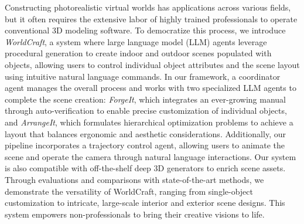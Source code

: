 Constructing photorealistic virtual worlds has applications across various fields, but it often requires the extensive labor of highly trained professionals to operate conventional 3D modeling software. 
%
To democratize this process, we introduce \emph{WorldCraft}, a system where large language model (LLM) agents leverage procedural generation to create indoor and outdoor scenes populated with objects, allowing users to control individual object attributes and the scene layout using intuitive natural language commands.
%
In our framework, a coordinator agent manages the overall process and works with two specialized LLM agents to complete the scene creation:  \emph{ForgeIt}, which integrates an ever-growing manual through auto-verification to enable precise customization of individual objects, and \emph{ArrangeIt}, which formulates hierarchical optimization problems to achieve a layout that balances ergonomic and aesthetic considerations.
%
Additionally, our pipeline incorporates a trajectory control agent, allowing users to animate the scene and operate the camera through natural language interactions. Our system is also compatible with off-the-shelf deep 3D generators to enrich scene assets.
%
Through evaluations and comparisons with state-of-the-art methods, we demonstrate the versatility of WorldCraft, ranging from single-object customization to intricate, large-scale interior and exterior scene designs. This system empowers non-professionals to bring their creative visions to life.






